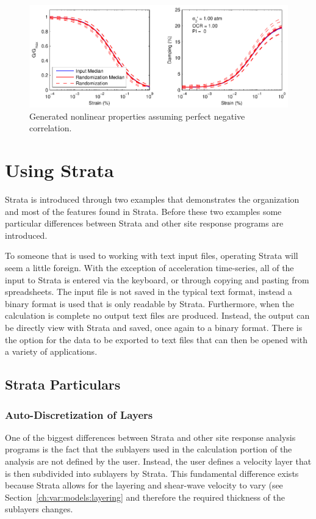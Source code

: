 \documentclass[12pt,oneside]{book}
\begin{document}
\begin{figure}[tp]
    \begin{center}
        \includegraphics[width=\linewidth]{figures/rand/nlProps.pdf}
    \end{center}
    \caption{Generated nonlinear properties assuming perfect negative correlation.}
    \label{fig:rand:nlProps}
\end{figure}

\chapter{Using Strata}\label{ch:strata}
Strata is introduced through two examples that demonstrates the organization and most of the
features found in Strata. Before these two examples some particular differences between Strata and
other site response programs are introduced. 

To someone that is used to working with text input files, operating Strata will seem a little
foreign.  With the exception of acceleration time-series, all of the input to Strata is
entered via the keyboard, or through copying and pasting from spreadsheets.  The input file is not
saved in the typical text format, instead a binary format is used that is only readable by Strata.
Furthermore, when the calculation is complete no output text files are produced.  Instead, the
output can be directly view with Strata and saved, once again to a binary format.  There is the
option for the data to be exported to text files that can then be opened with a variety of
applications.

\section{Strata Particulars}
\subsection{Auto-Discretization of Layers}
One of the biggest differences between Strata and other site response analysis programs is the fact
that the sublayers used in the calculation portion of the analysis are not defined by the user.
Instead, the user defines a velocity layer that is then subdivided into sublayers by Strata.  This
fundamental difference exists because Strata allows for the layering and shear-wave velocity to vary
(see Section~\ref{ch:var:models:layering} and therefore the required thickness of the sublayers
changes.
\end{document}

